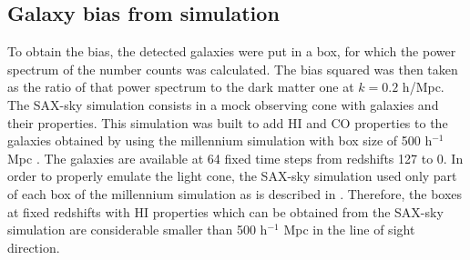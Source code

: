 \documentclass[useAMS,usenatbib]{mn2e}
\begin{document}
\subsection{Galaxy bias from simulation}


To obtain the bias, the detected galaxies were put in a box, for which the power spectrum of the number counts was calculated. The bias squared was then taken as the ratio of that power spectrum to the dark matter one at $k=0.2$ h/Mpc. 
The SAX-sky simulation consists in a mock observing cone with galaxies and their properties. This simulation was built to add HI and CO properties to the galaxies obtained by \cite{2007MNRAS.375....2D} using the  millennium simulation with box size of 500 h$^{-1}$ Mpc \cite{2005Natur.435..629S}. The galaxies are available at  64 fixed time steps from redshifts 127 to 0. In order to properly emulate the light cone, the SAX-sky simulation used only part of each box of the millennium simulation as is described in \cite{2009ApJ...703.1890O}.  Therefore, the boxes at fixed redshifts with HI properties which can be obtained from the SAX-sky simulation are considerable smaller than 500 h$^{-1}$ Mpc in the line of sight direction. 
%


\end{document}
